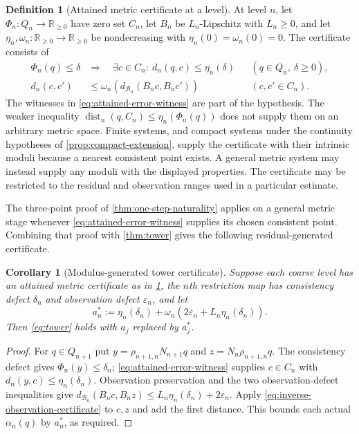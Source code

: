 \documentclass[11pt]{article}
\newtheorem{corollary}[theorem]{Corollary}
\theoremstyle{definition}
\newtheorem{definition}[theorem]{Definition}
\theoremstyle{remark}
\numberwithin{equation}{section}
\newcommand{\dist}{\operatorname{dist}}
\newcommand{\cB}{\mathcal B}
\newcommand{\eps}{\varepsilon}
\begin{document}
\begin{definition}[Attained metric certificate at a level]
\label{def:attained-metric-certificate}
At level $n$, let $\Phi_n:Q_n\to\mathbb R_{\ge0}$ have zero set $C_n$,
let $B_n$ be $L_n$-Lipschitz with $L_n\ge0$, and let
$\eta_n,\omega_n:\mathbb R_{\ge0}\to\mathbb R_{\ge0}$ be nondecreasing
with $\eta_n(0)=\omega_n(0)=0$. The certificate consists of
\begin{align}
 \Phi_n(q)\le\delta
 &\Longrightarrow\quad
 \exists c\in C_n:\ d_n(q,c)\le\eta_n(\delta)
 &&(q\in Q_n,\ \delta\ge0),\label{eq:attained-error-witness}\\
 d_n(c,c')
 &\le\omega_n\!\left(d_{\cB_n}(B_nc,B_nc')\right)
 &&(c,c'\in C_n).\label{eq:inverse-observation-certificate}
\end{align}
The witnesses in \eqref{eq:attained-error-witness} are part of the
hypothesis. The weaker inequality
$\dist_n(q,C_n)\le\eta_n(\Phi_n(q))$ does not supply them on an arbitrary
metric space. Finite systems, and compact systems under the continuity
hypotheses of \cref{prop:compact-extension}, supply the certificate with
their intrinsic moduli because a nearest consistent point exists. A general
metric system may instead supply any moduli with the displayed properties.
The certificate may be restricted to the residual and observation ranges
used in a particular estimate.
\end{definition}

The three-point proof of \cref{thm:one-step-naturality} applies on a general
metric stage whenever \eqref{eq:attained-error-witness} supplies its chosen
consistent point. Combining that proof with \cref{thm:tower} gives the
following residual-generated certificate.

\begin{corollary}[Modulus-generated tower certificate]\label{cor:modulus-tower}
Suppose each coarse level has an attained metric certificate as in
\cref{def:attained-metric-certificate}, the $n$th restriction map has
consistency defect $\delta_n$ and observation defect $\eps_n$, and let
\[
 a_n^*:=\eta_n(\delta_n)+
 \omega_n\!\left(2\eps_n+L_n\eta_n(\delta_n)\right).
\]
Then \eqref{eq:tower} holds with $a_j$ replaced by $a_j^*$.
\end{corollary}

\begin{proof}
For $q\in Q_{n+1}$ put $y=\rho_{n+1,n}N_{n+1}q$ and
$z=N_n\rho_{n+1,n}q$. The consistency defect gives
$\Phi_n(y)\le\delta_n$; \eqref{eq:attained-error-witness} supplies
$c\in C_n$ with $d_n(y,c)\le\eta_n(\delta_n)$. Observation preservation
and the two observation-defect inequalities give
$d_{\cB_n}(B_nc,B_nz)\le L_n\eta_n(\delta_n)+2\eps_n$.
Apply \eqref{eq:inverse-observation-certificate} to $c,z$ and add the first
distance. This bounds each actual $\alpha_n(q)$ by $a_n^*$, as required.
\end{proof}
\end{document}
